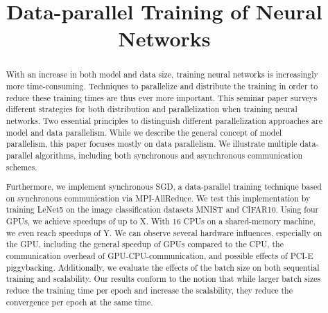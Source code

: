 \documentclass[conference,compsoc,a4paper]{IEEEtran}
\begin{document}
\title{Data-parallel Training of Neural Networks}


\author{
}


\maketitle

\begin{abstract}
With an increase in both model and data size, training neural networks is increasingly more time-consuming.
Techniques to parallelize and distribute the training in order to reduce these training times are thus ever more important.
This seminar paper surveys different strategies for both distribution and parallelization when training neural networks.
Two essential principles to distinguish different parallelization approaches are model and data parallelism.
While we describe the general concept of model parallelism, this paper focuses mostly on data parallelism.
We illustrate multiple data-parallel algorithms, including both synchronous and asynchronous communication schemes.

Furthermore, we implement synchronous SGD, a data-parallel training technique based on synchronous communication via MPI-AllReduce.
We test this implementation by training LeNet5 on the image classification datasets MNIST and CIFAR10.
Using four GPUs, we achieve speedups of up to X. %
With 16 CPUs on a shared-memory machine, we even reach speedups of Y. %
We can observe several hardware influences, especially on the GPU, including the general speedup of GPUs compared to the CPU, the communication overhead of GPU-CPU-communication, and possible effects of PCI-E piggybacking.
Additionally, we evaluate the effects of the batch size on both sequential training and scalability.
Our results conform to the notion that while larger batch sizes reduce the training time per epoch and increase the scalability, they reduce the convergence per epoch at the same time.

\end{abstract}
\end{document}
